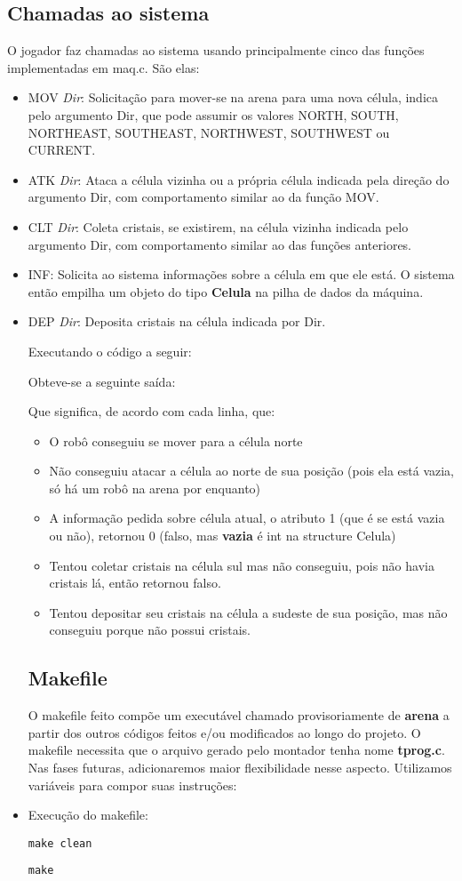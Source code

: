 \documentclass[12pt, a4paper]{article}
\begin{document}
\subsection{Chamadas ao sistema}
O jogador faz chamadas ao sistema usando principalmente cinco das funções implementadas em maq.c. São elas:
\begin{itemize}
\item MOV \textit{Dir}: Solicitação para mover-se na arena para uma nova célula, indica pelo argumento Dir, que pode assumir os valores NORTH, SOUTH, NORTHEAST, SOUTHEAST, NORTHWEST, SOUTHWEST ou CURRENT.
\item ATK \textit{Dir}: Ataca a célula vizinha ou a própria célula indicada pela direção do argumento Dir, com comportamento similar ao da função MOV.
\item CLT \textit{Dir}: Coleta cristais, se existirem, na célula vizinha indicada pelo argumento Dir, com comportamento similar ao das funções anteriores.
\item INF: Solicita ao sistema informações sobre a célula em que ele está. O sistema então empilha um objeto do tipo \textbf{Celula} na pilha de dados da máquina.
\item DEP \textit{Dir}: Deposita cristais na célula indicada por Dir.

Executando o código a seguir:

Obteve-se a seguinte saída:

Que significa, de acordo com cada linha, que:
\begin{itemize}
\item O robô conseguiu se mover para a célula norte 
\item Não conseguiu atacar a célula ao norte de sua posição (pois ela está vazia, só há um robô na arena por enquanto)
\item A informação pedida sobre célula atual, o atributo 1 (que é se está vazia ou não), retornou 0 (falso, mas \textbf{vazia} é int na structure Celula)
\item Tentou coletar cristais na célula sul mas não conseguiu, pois não havia cristais lá, então retornou falso.
\item Tentou depositar seu cristais na célula a sudeste de sua posição, mas não conseguiu porque não possui cristais.
\end{itemize}
\subsection{Makefile}
O makefile feito compõe um executável chamado provisoriamente de \textbf{arena} a partir dos outros códigos feitos e/ou modificados ao longo do projeto. O makefile necessita que o arquivo gerado pelo montador tenha nome \textbf{tprog.c}. Nas fases futuras, adicionaremos maior flexibilidade nesse aspecto. Utilizamos variáveis para compor suas instruções:

\clearpage
\item Execução do makefile:
\begin{lstlisting}
make clean
\end{lstlisting}

\begin{lstlisting}
make
\end{lstlisting}

\end{itemize}
\end{document}
